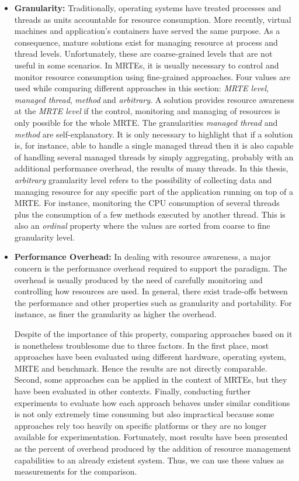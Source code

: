 \begin{itemize}
\item \textbf{Granularity:}
Traditionally, operating systems have treated processes and threads as units accountable for resource consumption.
More recently, virtual machines and application's containers have served the same purpose.
As a consequence, mature solutions exist for managing resource at process and thread levels.
Unfortunately, these are coarse-grained levels that are not useful in some scenarios.
In MRTEs, it is usually necessary to control and monitor resource consumption using fine-grained approaches.
Four values are used while comparing different approaches in this section: \textit{MRTE level}, \textit{managed thread}, \textit{method} and \textit{arbitrary}.
A solution provides resource awareness at the \textit{MRTE level} if the control, monitoring and managing of resources is only possible for the whole MRTE.
The granularities \textit{managed thread} and \textit{method} are self-explanatory.
It is only necessary to highlight that if a solution is, for instance, able to handle a single managed thread then it is also capable of handling several managed threads by simply aggregating, probably with an additional performance overhead, the results of many threads.
In this thesis, \textit{arbitrary} granularity level refers to the possibility of collecting data and managing resource for any specific part of the application running on top of a MRTE.
For instance, monitoring the CPU consumption of several threads plus the consumption of a few methods executed by another thread.
This is also an \textit{ordinal} property where the values are sorted from coarse to fine granularity level.

\item \textbf{Performance Overhead:} 
In dealing with resource awareness, a major concern is the performance overhead required to support the paradigm.
The overhead is usually produced by the need of carefully monitoring and controlling how resources are used.
In general, there exist trade-offs between the performance and other properties such as granularity and portability.
For instance, as finer the granularity as higher the overhead.

Despite of the importance of this property, comparing approaches based on it is nonetheless troublesome due to three factors.
In the first place, most approaches have been evaluated using different hardware, operating system, MRTE and benchmark.
Hence the results are not directly comparable.  
Second, some approaches can be applied in the context of MRTEs, but they have been evaluated in other contexts.
Finally, conducting further experiments to evaluate how each approach behaves under similar conditions is not only extremely time consuming but also impractical because some approaches rely too heavily on specific platforms or they are no longer available for experimentation.
Fortunately, most results have been presented as the percent of overhead produced by the addition of resource management capabilities to an already existent system.
Thus, we can use these values as measurements for the comparison.


\end{itemize}
